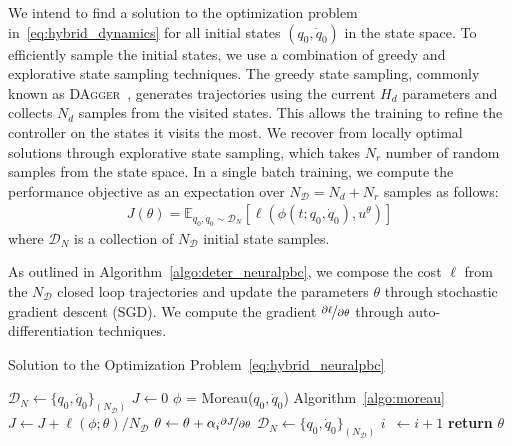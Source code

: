 We intend to find a solution to the optimization problem
in~\eqref{eq:hybrid_dynamics} for all initial states $(q_0, \dot{q}_0)$ in the
state space.
%
To efficiently sample the initial states, we use a combination of greedy and
explorative state sampling techniques.
%
The greedy state sampling, commonly known as \textsc{DAgger}~\cite{ross2011no},
generates trajectories using the current $H_d$ parameters and collects $N_d$
samples from the visited states. 
%
This allows the training to refine the controller on the states it visits the
most.
%
We recover from locally optimal solutions through explorative state sampling,
which takes $N_r$ number of random samples from the state space.
%
In a single batch training, we compute the performance objective as an expectation
over $N_{\mathcal{D}} = N_d+N_r$ samples as follows:
\begin{align*}
    J(\theta) = \mathbb{E}_{q_0, \dot{q}_0 \sim \mathcal{D}_N}[ \ell(\phi(t; q_0, \dot{q}_0), u^\theta)]
\end{align*}
\noindent where $\mathcal{D}_N$ is a collection of $N_{\mathcal{D}}$ initial state samples.


As outlined in Algorithm~\ref{algo:deter_neuralpbc}, we compose the cost
$\ell$ from the $N_{\mathcal{D}}$ closed loop trajectories and update the
parameters $\theta$ through stochastic gradient descent (SGD). 
%
We compute the gradient $\nicefrac{\partial \ell}{\partial \theta}$ through
auto-differentiation techniques.
%

\begin{algorithm}
    \caption{Solution to the Optimization Problem~\eqref{eq:hybrid_neuralpbc}}
    \label{algo:deter_neuralpbc}
    \small
    \begin{algorithmic}[1]
        \algrenewcommand\algorithmicindent{0em} %
        \State $\mathcal{D}_N \gets \{q_0, \dot{q}_0\}_{(N_{\mathcal{D}})}$   
        \algrenewcommand\algorithmicindent{1.1em} %
        \State $J \gets 0$
            \State $\phi$ = Moreau($q_0, \dot{q}_0$) \Comment Algorithm~\eqref{algo:moreau}
            \State $J \gets J + \ell(\phi; \theta)/N_{\mathcal{D}}$ 
        \EndFor
        \State $\theta \gets \theta + \alpha_i \nicefrac{\partial J}{\partial \theta}$
        \State $\mathcal{D}_N \gets \{q_0, \dot{q}_0\}_{(N_{\mathcal{D}})}$
        \State $i \;\:\gets i + 1$
        \EndWhile
        \State \textbf{return} $\theta$
    \end{algorithmic}
\end{algorithm}

